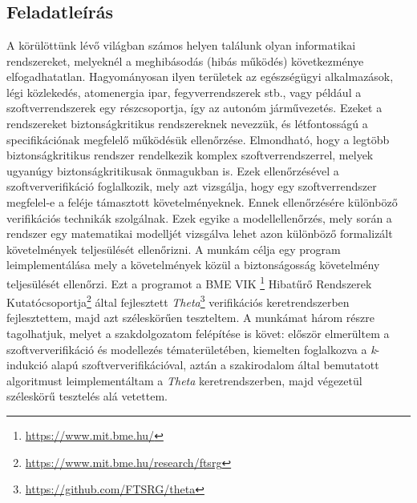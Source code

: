 \chapter{\bevezetes}

\section{Feladatleírás}

A körülöttünk lévő világban számos helyen találunk olyan informatikai rendszereket, melyeknél a meghibásodás (hibás működés) következménye elfogadhatatlan. Hagyományosan ilyen területek az egészségügyi alkalmazások, légi közlekedés, atomenergia ipar, fegyverrendszerek stb., vagy például a szoftverrendszerek egy részcsoportja, így az autonóm járművezetés. Ezeket a rendszereket biztonságkritikus rendszereknek nevezzük, és létfontosságú a specifikációnak megfelelő működésük ellenőrzése.
\newline
\newline
Elmondható, hogy a legtöbb biztonságkritikus rendszer rendelkezik komplex szoftverrendszerrel, melyek ugyanúgy biztonságkritikusak önmagukban is. Ezek ellenőrzésével a szoftververifikáció foglalkozik, mely azt vizsgálja, hogy egy szoftverrendszer megfelel-e a feléje támasztott követelményeknek. 
\newline
\newline
Ennek ellenőrzésére különböző verifikációs technikák szolgálnak. Ezek egyike a modellellenőrzés, mely során a rendszer egy matematikai modelljét vizsgálva lehet azon különböző formalizált követelmények teljesülését ellenőrizni.
\newline
\newline
A munkám célja egy program leimplementálása mely a követelmények közül a biztonságosság követelmény teljesülését ellenőrzi. Ezt a programot a BME VIK \bmemit\footnote{\url{https://www.mit.bme.hu/}} Hibatűrő Rendszerek Kutatócsoportja\footnote{\url{https://www.mit.bme.hu/research/ftsrg}} által fejlesztett \emph{Theta}\footnote{\url{https://github.com/FTSRG/theta}} verifikációs keretrendszerben fejlesztettem, majd azt széleskörűen teszteltem.
\newline
\newline
A munkámat három részre tagolhatjuk, melyet a szakdolgozatom felépítése is követ: először elmerültem a szoftververifikáció és modellezés tématerületében, kiemelten foglalkozva a \emph{k}-indukció alapú szoftververifikációval, aztán a szakirodalom által bemutatott algoritmust leimplementáltam a \emph{Theta} keretrendszerben, majd végezetül széleskörű tesztelés alá vetettem.

